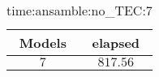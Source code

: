 \begin{table}[!ht]
	\centering
	\begin{tabular}{|c|c|}
		\hline
		Models & elapsed \\ \hline
		$7$ & $817.56$ \\ \hline
	\end{tabular}
	\caption{time:ansamble:no_TEC:7}
	\label{tab:time:ansamble:no_TEC:7}
\end{table}
